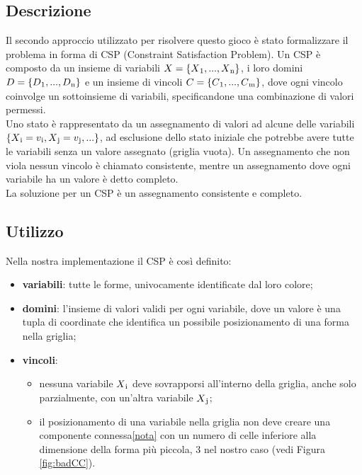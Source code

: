 \subsection{Descrizione}
Il secondo approccio utilizzato per risolvere questo gioco è stato formalizzare il problema in forma di CSP (Constraint Satisfaction Problem). Un CSP è composto da un insieme di variabili $X = \{X\textsubscript{1},...,X\textsubscript{n}\}$, i loro domini  $D = \{D\textsubscript{1},...,D\textsubscript{n}\}$ e un insieme di vincoli  $C = \{C\textsubscript{1},...,C\textsubscript{m}\}$, dove ogni vincolo coinvolge un sottoinsieme di variabili, specificandone una combinazione di valori permessi.\\
Uno stato è rappresentato da un assegnamento di valori ad alcune delle variabili $\{X\textsubscript{i} = v\textsubscript{i}, X\textsubscript{j} = v\textsubscript{j},...\}$, ad esclusione dello stato iniziale che potrebbe avere tutte le variabili senza un valore assegnato (griglia vuota).
Un assegnamento che non viola nessun vincolo è chiamato consistente, mentre un assegnamento dove ogni variabile ha un valore è detto completo. \\
La soluzione per un CSP è un assegnamento consistente e completo.

\subsection{Utilizzo}
Nella nostra implementazione il CSP è così definito:
\begin{itemize}
	\item \textbf{variabili}: tutte le forme, univocamente identificate dal loro colore;
	\item \textbf{domini}: l'insieme di valori validi per ogni variabile, dove un valore è una tupla di coordinate che identifica un possibile posizionamento di una forma nella griglia;
	\item \textbf{vincoli}: 
		\begin{itemize}
			\item nessuna variabile $X\textsubscript{i}$ deve sovrapporsi all'interno della griglia, anche solo parzialmente, con un'altra variabile $X\textsubscript{j}$;
			\item il posizionamento di una variabile nella griglia non deve creare una componente connessa\vref{nota} con un numero di celle inferiore alla dimensione della forma più piccola, 3 nel nostro caso (vedi Figura \ref{fig:badCC}).
		\end{itemize}
\end{itemize}

